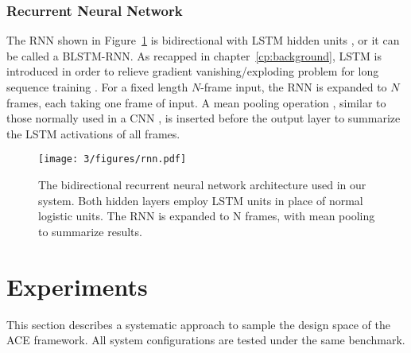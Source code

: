 \subsubsection{Recurrent Neural Network}

The RNN shown in Figure~\ref{fig:3-rnn} is bidirectional with LSTM hidden units \cite{hochreiter1997long}, or it can be called a BLSTM-RNN. As recapped in chapter~\ref{cp:background}, LSTM is introduced in order to relieve gradient vanishing/exploding problem for long sequence training \cite{bengio2009learning}. For a fixed length $N$-frame input, the RNN is expanded to $N$ frames, each taking one frame of input. A mean pooling operation \cite{maas2011learning}, similar to those normally used in a CNN \cite{lecun1995convolutional}, is inserted before the output layer to summarize the LSTM activations of all frames.
\begin{figure}[h]
\centering
\texttt{[image: 3/figures/rnn.pdf]}
\caption{The bidirectional recurrent neural network architecture used in our system. Both hidden layers employ LSTM units in place of normal logistic units. The RNN is expanded to N frames, with mean pooling to summarize results.}
\label{fig:3-rnn}
\end{figure}

\section{Experiments} \label{sec:3-exper}
This section describes a systematic approach to sample the design space of the ACE framework. All system configurations are tested under the same benchmark. %

